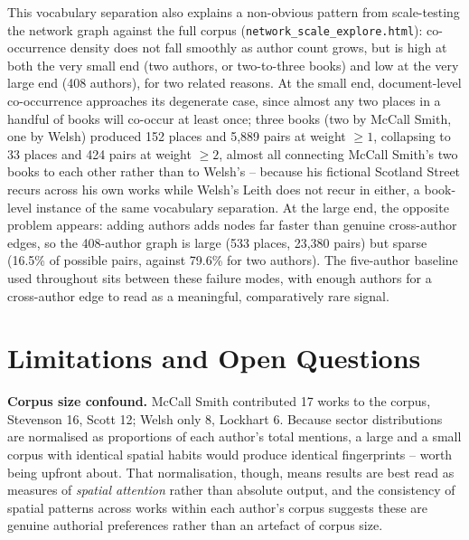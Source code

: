 \documentclass[logo,msc]{infthesis}
\begin{document}
This vocabulary separation also explains a non-obvious pattern from scale-testing the network graph against the full corpus (\texttt{network\_scale\_explore.html}): co-occurrence density does not fall smoothly as author count grows, but is high at both the very small end (two authors, or two-to-three books) and low at the very large end (408 authors), for two related reasons. At the small end, document-level co-occurrence approaches its degenerate case, since almost any two places in a handful of books will co-occur at least once; three books (two by McCall Smith, one by Welsh) produced 152 places and 5,889 pairs at weight $\geq 1$, collapsing to 33 places and 424 pairs at weight $\geq 2$, almost all connecting McCall Smith's two books to each other rather than to Welsh's -- because his fictional Scotland Street recurs across his own works while Welsh's Leith does not recur in either, a book-level instance of the same vocabulary separation. At the large end, the opposite problem appears: adding authors adds nodes far faster than genuine cross-author edges, so the 408-author graph is large (533 places, 23,380 pairs) but sparse (16.5\% of possible pairs, against 79.6\% for two authors). The five-author baseline used throughout sits between these failure modes, with enough authors for a cross-author edge to read as a meaningful, comparatively rare signal.
 
\section{Limitations and Open Questions}
\label{sec:limitations}
 
\textbf{Corpus size confound.} McCall Smith contributed 17 works to the corpus, Stevenson 16, Scott 12; Welsh only 8, Lockhart 6. Because sector distributions are normalised as proportions of each author's total mentions, a large and a small corpus with identical spatial habits would produce identical fingerprints -- worth being upfront about. That normalisation, though, means results are best read as measures of \emph{spatial attention} rather than absolute output, and the consistency of spatial patterns across works within each author's corpus suggests these are genuine authorial preferences rather than an artefact of corpus size.
 
\end{document}
